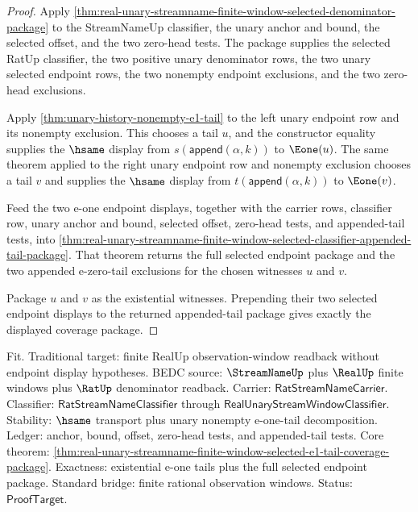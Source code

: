 \begin{proof}
Apply
\autoref{thm:real-unary-streamname-finite-window-selected-denominator-package}
to the StreamNameUp classifier, the unary anchor and bound, the selected
offset, and the two zero-head tests. The package supplies the selected RatUp
classifier, the two positive unary denominator rows, the two unary selected
endpoint rows, the two nonempty endpoint exclusions, and the two zero-head
exclusions.

Apply \autoref{thm:unary-history-nonempty-e1-tail} to the left unary endpoint
row and its nonempty exclusion. This chooses a tail $u$, and the constructor
equality supplies the $\hsame$ display from $s(\mathsf{append}(\alpha,k))$ to
$\Eone(u)$. The same theorem applied to the right unary endpoint row and
nonempty exclusion chooses a tail $v$ and supplies the $\hsame$ display from
$t(\mathsf{append}(\alpha,k))$ to $\Eone(v)$.

Feed the two e-one endpoint displays, together with the carrier rows, classifier
row, unary anchor and bound, selected offset, zero-head tests, and appended-tail
tests, into
\autoref{thm:real-unary-streamname-finite-window-selected-classifier-appended-tail-package}.
That theorem returns the full selected endpoint package and the two appended
e-zero-tail exclusions for the chosen witnesses $u$ and $v$.

Package $u$ and $v$ as the existential witnesses. Prepending their two selected
endpoint displays to the returned appended-tail package gives exactly the
displayed coverage package.
\end{proof}

Fit. Traditional target: finite RealUp observation-window readback without
endpoint display hypotheses. BEDC source: $\StreamNameUp$ plus $\RealUp$ finite
windows plus $\RatUp$ denominator readback. Carrier:
$\mathsf{RatStreamNameCarrier}$. Classifier:
$\mathsf{RatStreamNameClassifier}$ through
$\mathsf{RealUnaryStreamWindowClassifier}$. Stability: $\hsame$ transport plus
unary nonempty e-one-tail decomposition. Ledger: anchor, bound, offset,
zero-head tests, and appended-tail tests. Core theorem:
\autoref{thm:real-unary-streamname-finite-window-selected-e1-tail-coverage-package}.
Exactness: existential e-one tails plus the full selected endpoint package.
Standard bridge: finite rational observation windows. Status:
$\mathsf{ProofTarget}$.

